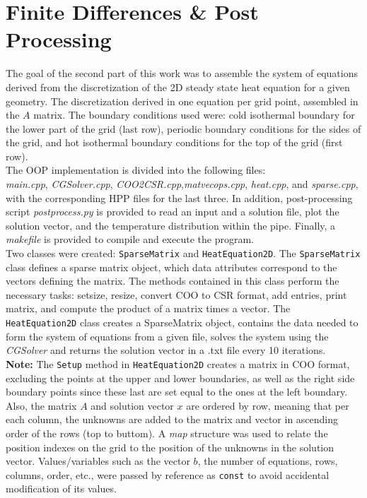 \documentclass[a4paper]{article}
\begin{document}
\section{Finite Differences \& Post Processing}

The goal of the second part of this work was to assemble the system of equations derived from the discretization of the 2D steady state heat equation for a given geometry. The discretization derived in one equation per grid point, assembled in the $A$ matrix. The boundary conditions used were: cold isothermal boundary for the lower part of the grid (last row), periodic boundary conditions for the sides of the grid, and hot isothermal boundary conditions for the top of the grid (first row).\\

The OOP implementation is divided into the following files:\\ \textit{main.cpp}, \textit{CGSolver.cpp}, \textit{COO2CSR.cpp},\textit{matvecops.cpp}, \textit{heat.cpp}, and \textit{sparse.cpp}, with the corresponding HPP files for the last three. In addition, post-processing script \textit{postprocess.py} is provided to read an input and a solution file, plot the solution vector, and the temperature distribution within the pipe. Finally, a \textit{makefile} is provided to compile and execute the program.\\

Two classes were created: \texttt{SparseMatrix} and \texttt{HeatEquation2D}. The \texttt{SparseMatrix} class defines a sparse matrix object, which data attributes correspond to the vectors defining the matrix. The methods contained in this class perform the necessary tasks: setsize, resize, convert COO to CSR format, add entries, print matrix, and compute the product of a matrix times a vector. The \texttt{HeatEquation2D} class creates a SparseMatrix object, contains the data needed to form the system of equations from a given file, solves the system using the \textit{CGSolver} and returns the solution vector in a .txt file every 10 iterations. \\

\textbf{Note:} The \texttt{Setup} method in \texttt{HeatEquation2D} creates a matrix in COO format, excluding the points at the upper and lower boundaries, as well as the right side boundary points since these last are set equal to the ones at the left boundary. Also, the matrix $A$ and solution vector $x$ are ordered by row, meaning that per each column, the unknowns are added to the matrix and vector in ascending order of the rows (top to buttom). A \textit{map} structure was used to relate the position indexes on the grid to the position of the unknowns in the solution vector. Values/variables such as the vector $b$, the number of equations, rows, columns, order, etc., were passed by reference as  \texttt{const} to avoid accidental modification of its values.\\
\end{document}
